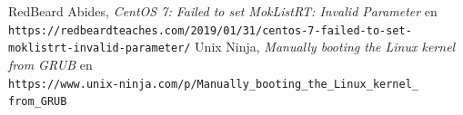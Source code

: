 \documentclass{article}
\begin{document}
\renewcommand\refname{Bibliografía}
\begin{thebibliography}{99}
    RedBeard Abides, \textit{CentOS 7: Failed to set MokListRT: 
    Invalid Parameter} en \\
    \texttt{https://redbeardteaches.com/2019/01/31/centos-7-failed-to-set-\\
    moklistrt-invalid-parameter/}
    Unix Ninja, \textit{Manually booting the Linux kernel from GRUB} en \\
    \texttt{https://www.unix-ninja.com/p/Manually\_booting\_the\_Linux\_kernel\_
    from\_GRUB}

\end{thebibliography}
\end{document}
